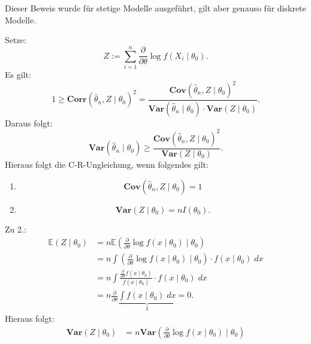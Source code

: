 \documentclass[10pt]{article}
\newcommand{\EW}{\mathbb{E}} %
\newcommand{\ablt}{\frac{\partial}{\partial \theta}}
\newenvironment{BWS}[1][]
{\begin{Beweis}[frametitle=#1]}{\end{Beweis}}
\begin{document}
	\begin{BWS}[Beweis 1.4.1 (Effizienz)]
		Dieser Beweis wurde für stetige Modelle ausgeführt, gilt aber genauso für diskrete Modelle.
		
		Setze:
		\begin{equation*}
			Z := \sum_{i=1}^{n} \frac{\partial}{\partial \theta} \log f(X_i \mid \theta_0).
		\end{equation*}
		Es gilt:
		\begin{equation*}
			1 \geq \textbf{Corr}(\hat{\theta}_n, Z \mid \theta_0)^2 = \frac{\textbf{Cov}(\hat{\theta}_n, Z \mid \theta_0)^2}{\textbf{Var}(\hat{\theta}_n \mid \theta_0) \cdot \textbf{Var}(Z \mid \theta_0)}.
		\end{equation*}
		Daraus folgt:
		\begin{equation*}
			\textbf{Var}(\hat{\theta}_n \mid \theta_0) \geq \frac{\textbf{Cov}(\hat{\theta}_n, Z \mid \theta_0)^2}{\textbf{Var}(Z \mid \theta_0)}.
		\end{equation*}
		Hieraus folgt die C-R-Ungleichung, wenn folgendes gilt:
		\begin{enumerate}
			\item 
			\begin{equation*}
				\textbf{Cov}(\hat{\theta}_n, Z \mid \theta_0) = 1
			\end{equation*}
			\item 
			\begin{equation*}
				\textbf{Var}(Z\mid \theta_0) = nI(\theta_0).
			\end{equation*}
		\end{enumerate}
		Zu 2.:
		\begin{equation*}
			\begin{split}
				\EW (Z \mid \theta_0) &=  n\EW\left(\ablt \log f(x \mid \theta_0)\mid \theta_0\right)\\
				&= n \int \left(\ablt \log f(x \mid \theta_0)\mid \theta_0\right) \cdot f(x \mid \theta_0) \; dx\\
				&= n \int \frac{\ablt f(x \mid \theta_0)}{f(x \mid \theta_0)} \cdot f(x \mid \theta_0) \; dx\\
				&= n \ablt \underbrace{\int f(x \mid \theta_0) \; dx}_{1} = 0.
			\end{split}
		\end{equation*}
		Hieraus folgt:
		\begin{equation*}
			\begin{split}
				\textbf{Var}(Z \mid \theta_0) &= n \textbf{Var}\left(\ablt \log f(x \mid \theta_0)\mid \theta_0 \right)\\

\end{split}
\end{equation*}
\end{BWS}
\end{document}
